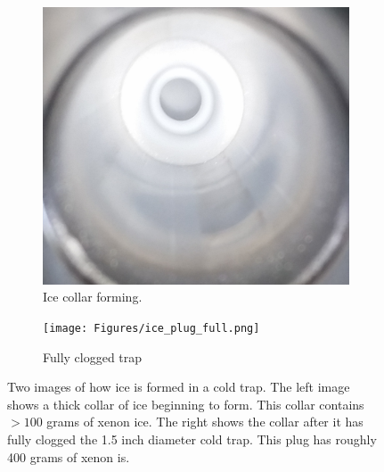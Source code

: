\documentclass[12pt]{article}
\begin{document}
\begin{figure}[h!]
\centering
\begin{subfigure}{0.45\textwidth}
  \centering
  \includegraphics[width=\textwidth]{Figures/ice_plug_start.png}
  \caption{Ice collar forming.}
  \label{fig:plugstart}
\end{subfigure}\hfill%
\begin{subfigure}{0.45\textwidth}
  \centering
  \texttt{[image: Figures/ice\_plug\_full.png]}
  \caption{Fully clogged trap}
  \label{fig:plugfull}
\end{subfigure}
\caption{Two images of how ice is formed in a cold trap. The left image shows a thick collar of ice beginning to form. This collar contains $>100$ grams of xenon ice. The right shows the collar after it has fully clogged the 1.5 inch diameter cold trap. This plug has roughly 400 grams of xenon is.} 
\label{fig:iceplug}
\end{figure}
\end{document}
